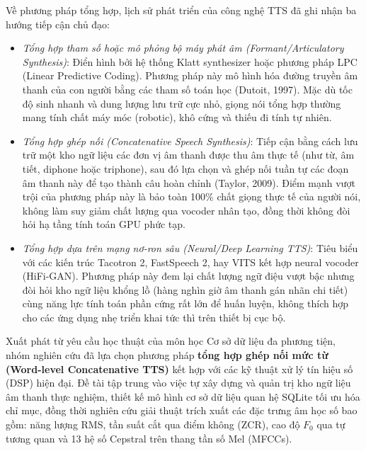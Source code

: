 Về phương pháp tổng hợp, lịch sử phát triển của công nghệ TTS đã ghi nhận ba hướng tiếp cận chủ đạo:
\begin{itemize}
    \item \textit{Tổng hợp tham số hoặc mô phỏng bộ máy phát âm (Formant/Articulatory Synthesis)}: Điển hình bởi hệ thống Klatt synthesizer hoặc phương pháp LPC (Linear Predictive Coding). Phương pháp này mô hình hóa đường truyền âm thanh của con người bằng các tham số toán học (Dutoit, 1997). Mặc dù tốc độ sinh nhanh và dung lượng lưu trữ cực nhỏ, giọng nói tổng hợp thường mang tính chất máy móc (robotic), khô cứng và thiếu đi tính tự nhiên.
    \item \textit{Tổng hợp ghép nối (Concatenative Speech Synthesis)}: Tiếp cận bằng cách lưu trữ một kho ngữ liệu các đơn vị âm thanh được thu âm thực tế (như từ, âm tiết, diphone hoặc triphone), sau đó lựa chọn và ghép nối tuần tự các đoạn âm thanh này để tạo thành câu hoàn chỉnh (Taylor, 2009). Điểm mạnh vượt trội của phương pháp này là bảo toàn 100\% chất giọng thực tế của người nói, không làm suy giảm chất lượng qua vocoder nhân tạo, đồng thời không đòi hỏi hạ tầng tính toán GPU phức tạp.
    \item \textit{Tổng hợp dựa trên mạng nơ-ron sâu (Neural/Deep Learning TTS)}: Tiêu biểu với các kiến trúc Tacotron 2, FastSpeech 2, hay VITS kết hợp neural vocoder (HiFi-GAN). Phương pháp này đem lại chất lượng ngữ điệu vượt bậc nhưng đòi hỏi kho ngữ liệu khổng lồ (hàng nghìn giờ âm thanh gán nhãn chi tiết) cùng năng lực tính toán phần cứng rất lớn để huấn luyện, không thích hợp cho các ứng dụng nhẹ triển khai tức thì trên thiết bị cục bộ.
\end{itemize}

Xuất phát từ yêu cầu học thuật của môn học Cơ sở dữ liệu đa phương tiện, nhóm nghiên cứu đã lựa chọn phương pháp \textbf{tổng hợp ghép nối mức từ (Word-level Concatenative TTS)} kết hợp với các kỹ thuật xử lý tín hiệu số (DSP) hiện đại. Đề tài tập trung vào việc tự xây dựng và quản trị kho ngữ liệu âm thanh thực nghiệm, thiết kế mô hình cơ sở dữ liệu quan hệ SQLite tối ưu hóa chỉ mục, đồng thời nghiên cứu giải thuật trích xuất các đặc trưng âm học số bao gồm: năng lượng RMS, tần suất cắt qua điểm không (ZCR), cao độ $F_0$ qua tự tương quan và 13 hệ số Cepstral trên thang tần số Mel (MFCCs).

